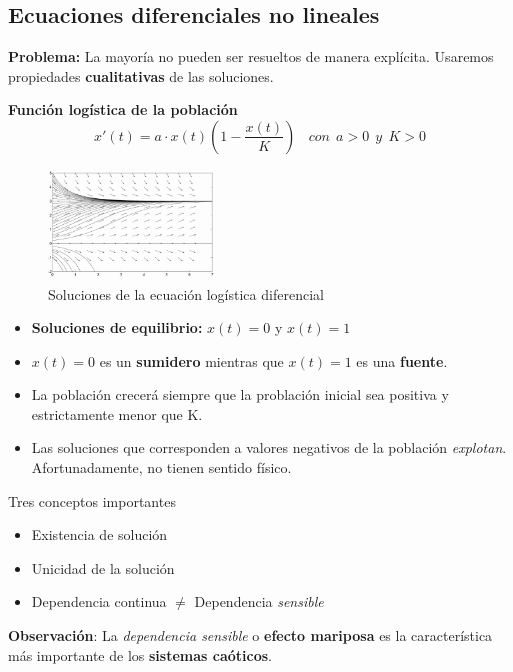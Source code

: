 \documentclass[8pt]{beamer}
\begin{document}
\subsection{Ecuaciones diferenciales no lineales}
\begin{frame}
\textbf{Problema:} La mayoría no pueden ser resueltos de manera explícita. Usaremos propiedades \textbf{cualitativas} de las soluciones.

\begin{example}
\textbf{Función logística de la población}
\begin{equation}
x'(t) = a\cdot x(t)\left(1-\frac{x(t)}{K}\right)~~~~con~~a>0~~y~~K>0
\end{equation}
\end{example}
\end{frame}

\begin{frame}
\begin{figure}[hbtp]
\centering
\includegraphics[width = 0.4\textwidth]{img/poblacion.png}
\caption{Soluciones de la ecuación logística diferencial}
\end{figure}\label{fig:poblacion}

\begin{itemize}
\item \textbf{Soluciones de equilibrio:} $x(t) = 0$ y $x(t)=1$
\item $x(t) = 0$ es un \textbf{sumidero} mientras que $x(t)=1$ es una \textbf{fuente}.
\item La población crecerá siempre que la problación inicial sea positiva y estrictamente menor que K.
\item Las soluciones que corresponden a valores negativos de la población \emph{explotan}. Afortunadamente, no tienen sentido físico.
\end{itemize}
\end{frame}

\begin{frame}
\begin{block}{Tres conceptos importantes}
\begin{itemize}
\item Existencia de solución
\item Unicidad de la solución
\item Dependencia continua $\neq$ Dependencia \emph{sensible}
\end{itemize}
\end{block}
\textbf{Observación}: La \emph{dependencia sensible} o \textbf{efecto mariposa} es la característica más importante de los \textbf{sistemas caóticos}.
\end{frame}
\end{document}
